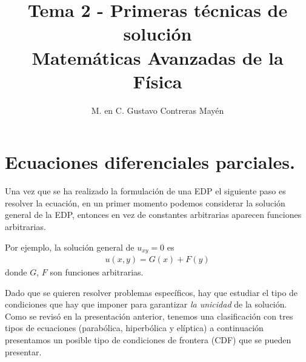 
\title{Tema 2 - Primeras técnicas de solución \\[0.3em]  \large{Matemáticas Avanzadas de la Física}\vspace{-3ex}}
\author{M. en C. Gustavo Contreras Mayén}
\date{ }

\pagestyle{fancy}
\fancyhf{}
\lhead{\leftmark}
\rfoot{\thepage}
\setlength{\headheight}{16pt}%


\vspace{-4cm}
\maketitle
\fontsize{14}{14}\selectfont
\tableofcontents
\newpage

\section{Ecuaciones diferenciales parciales.}

Una vez que se ha realizado la formulación de una EDP el siguiente paso es resolver la ecuación, en un primer momento podemos considerar la solución general de la EDP, entonces en vez de constantes arbitrarias aparecen funciones arbitrarias.
\par
Por ejemplo, la solución general de $u_{xy} = 0$ es 
\begin{align*}
u(x, y) = G(x) + F (y)
\end{align*}
donde $G$, $F$ son funciones arbitrarias.
\par
Dado que se quieren resolver problemas específicos, hay que estudiar el tipo de condiciones que hay que imponer para garantizar \emph{la unicidad} de la solución. Como se revisó en la presentación anterior, tenemos una clasificación con tres tipos de ecuaciones (parabólica, hiperbólica y elíptica) a continuación presentamos un posible tipo de condiciones de frontera (CDF) que se pueden presentar.
